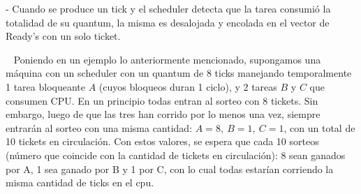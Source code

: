 - Cuando se produce un tick y el scheduler detecta que la tarea consumió la totalidad de su quantum, la misma es desalojada y encolada en el vector de Ready's con un solo ticket.

~
Poniendo en un ejemplo lo anteriormente mencionado, supongamos una máquina con un scheduler con
un quantum de 8 ticks manejando temporalmente 
1 tarea bloqueante $A$ (cuyos bloqueos duran 1 ciclo), y 2 tareas $B$ y $C$ que consumen CPU. En un principio todas entran al sorteo con 8
tickets. Sin embargo, luego de que las tres han corrido por lo menos una vez, siempre entrarán al sorteo con una misma cantidad: $A=8, \ B=1, \ C=1$, con un total de
10 tickets en circulación. Con estos valores, se espera que cada 10 sorteos (número que coincide con la cantidad de tickets en circulación): 8 sean ganados por A,
1 sea ganado por B y 1 por C, con lo cual todas estarían corriendo la misma cantidad de ticks en el cpu. 




 
